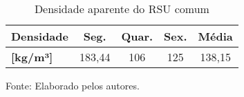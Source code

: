 \begin{center}
	\begin{table}[htbp]
  \centering
  \caption{Densidade aparente do RSU comum}
	\begin{tabular}{|p{5.43em}|c|c|c|c|}
		\toprule
		\rowcolor[rgb]{ .969,  .588,  .275} \textcolor[rgb]{ 1,  1,  1}{\textbf{Densidade}} & \multicolumn{1}{p{4.215em}|}{\textcolor[rgb]{ 1,  1,  1}{\textbf{Seg.}}} & \multicolumn{1}{p{4.215em}|}{\textcolor[rgb]{ 1,  1,  1}{\textbf{Quar.}}} & \multicolumn{1}{p{4.215em}|}{\textcolor[rgb]{ 1,  1,  1}{\textbf{Sex.}}} & \multicolumn{1}{p{4.215em}|}{\textcolor[rgb]{ 1,  1,  1}{\textbf{Média}}} \\
		\midrule
		\rowcolor[rgb]{ .969,  .588,  .275} \textcolor[rgb]{ 1,  1,  1}{\textbf{[kg/m³]}} & \cellcolor[rgb]{ .984,  .831,  .706}183,44 & \cellcolor[rgb]{ .984,  .831,  .706}106 & \cellcolor[rgb]{ .984,  .831,  .706}125 & \cellcolor[rgb]{ .984,  .831,  .706}138,15 \\
		\bottomrule
	\end{tabular}%
  \label{tab:densidade_aparente}%
\end{table}%
Fonte: Elaborado pelos autores.

\end{center}